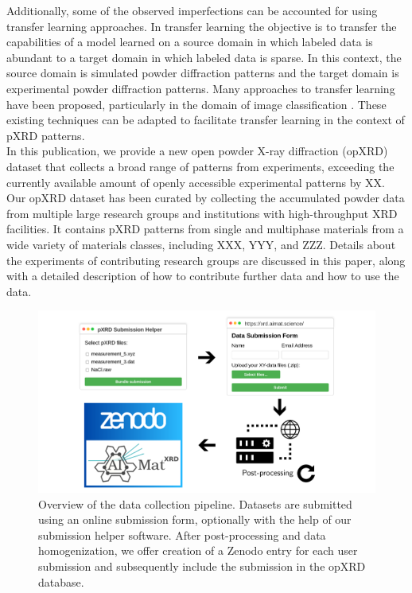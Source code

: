 Additionally, some of the observed imperfections can be accounted for using transfer learning approaches. In transfer learning the objective is to transfer the capabilities of a model learned on a source domain in which labeled data is abundant to a target domain in which labeled data is sparse\cite{Zhuang2021}. In this context, the source domain is simulated powder diffraction patterns and the target domain is experimental powder diffraction patterns. Many approaches to transfer learning have been proposed, particularly in the domain of image classification \cite{Gatys2016, Ganin2015}. These existing techniques can be adapted to facilitate transfer learning in the context of pXRD patterns.\\

In this publication, we provide a new open powder X-ray diffraction (opXRD) dataset that collects a broad range of patterns from experiments, exceeding the currently available amount of openly accessible experimental patterns by XX.
Our opXRD dataset has been curated by collecting the accumulated powder data from multiple large research groups and institutions with high-throughput XRD facilities. It contains pXRD patterns from single and multiphase materials from a wide variety of materials classes, including XXX, YYY, and ZZZ. Details about the experiments of contributing research groups are discussed in this paper, along with a detailed description of how to contribute further data and how to use the data. \\

\begin{figure}[!htb]
    \centering
    \includegraphics[width=\linewidth]{figures/overview.png}
    \caption{Overview of the data collection pipeline. Datasets are submitted using an online submission form, optionally with the help of our submission helper software. After post-processing and data homogenization, we offer creation of a Zenodo entry for each user submission and subsequently include the submission in the opXRD database.}
    \label{fig:overview}
\end{figure}

